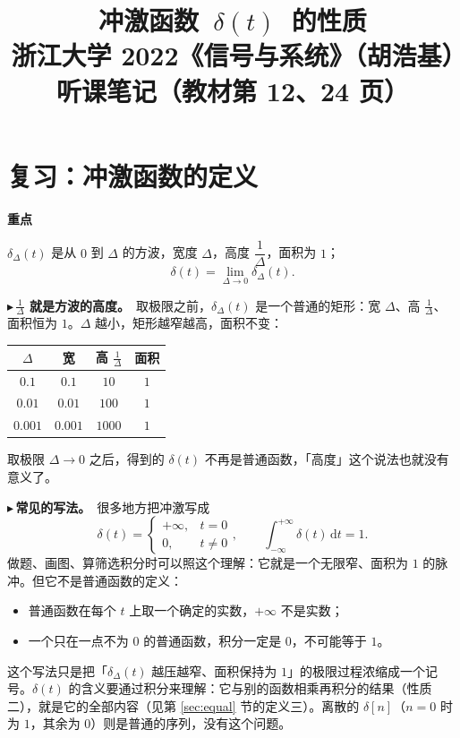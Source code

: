 \documentclass[UTF8,a4paper,11pt]{ctexart}
\title{冲激函数\ \texorpdfstring{$\delta(t)$}{δ(t)}\ 的性质\\\large 浙江大学 2022《信号与系统》（胡浩基）听课笔记（教材第 12、24 页）}
\author{}
\date{}
\newenvironment{remember}{\begin{rememberbox}\textbf{重点}\par\smallskip}{\end{rememberbox}}
\newcounter{ex}[section]
\newcommand{\point}[1]{\par\addvspace{1ex}\noindent\textcolor{ptteal}{$\blacktriangleright$\,\textbf{#1}}\ }
\begin{document}
\pagestyle{plain}
\maketitle

\section{复习：冲激函数的定义}\label{sec:def}
\begin{remember}
$\delta_\Delta(t)$ 是从 $0$ 到 $\Delta$ 的方波，宽度 $\Delta$，高度 $\dfrac1\Delta$，面积为 $1$；
\[
\delta(t)=\lim_{\Delta\to0}\delta_\Delta(t).
\]
\end{remember}
\point{$\frac1\Delta$ 就是方波的高度。}取极限之前，$\delta_\Delta(t)$ 是一个普通的矩形：宽 $\Delta$、高 $\frac1\Delta$、面积恒为 $1$。$\Delta$ 越小，矩形越窄越高，面积不变：
\begin{center}
\begin{tabular}{cccc}
\toprule
$\Delta$ & 宽 & 高 $\frac1\Delta$ & 面积\\
\midrule
$0.1$ & $0.1$ & $10$ & $1$\\
$0.01$ & $0.01$ & $100$ & $1$\\
$0.001$ & $0.001$ & $1000$ & $1$\\
\bottomrule
\end{tabular}
\end{center}
取极限 $\Delta\to0$ 之后，得到的 $\delta(t)$ 不再是普通函数，「高度」这个说法也就没有意义了。

\point{常见的写法。}很多地方把冲激写成
\[
\delta(t)=\begin{cases}+\infty,&t=0\\0,&t\ne0\end{cases},\qquad\int_{-\infty}^{+\infty}\delta(t)\,\mathrm{d}t=1 .
\]
做题、画图、算筛选积分时可以照这个理解：它就是一个无限窄、面积为 $1$ 的脉冲。但它不是普通函数的定义：
\begin{itemize}[nosep]
\item 普通函数在每个 $t$ 上取一个确定的实数，$+\infty$ 不是实数；
\item 一个只在一点不为 $0$ 的普通函数，积分一定是 $0$，不可能等于 $1$。
\end{itemize}
这个写法只是把「$\delta_\Delta(t)$ 越压越窄、面积保持为 $1$」的极限过程浓缩成一个记号。$\delta(t)$ 的含义要通过积分来理解：它与别的函数相乘再积分的结果（性质二），就是它的全部内容（见第 \ref{sec:equal} 节的定义三）。离散的 $\delta[n]$（$n=0$ 时为 $1$，其余为 $0$）则是普通的序列，没有这个问题。
\end{document}
